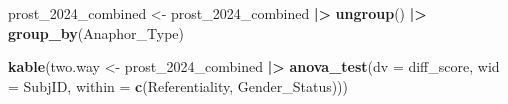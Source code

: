 \documentclass[
  10pt,
]{article}
\newenvironment{Shaded}{\begin{snugshade}}{\end{snugshade}}
\newcommand{\AttributeTok}[1]{\textcolor[rgb]{0.13,0.29,0.53}{#1}}
\newcommand{\FunctionTok}[1]{\textcolor[rgb]{0.13,0.29,0.53}{\textbf{#1}}}
\newcommand{\NormalTok}[1]{#1}
\newcommand{\OtherTok}[1]{\textcolor[rgb]{0.56,0.35,0.01}{#1}}
\newcommand{\SpecialCharTok}[1]{\textcolor[rgb]{0.81,0.36,0.00}{\textbf{#1}}}
\begin{document}
\begin{Shaded}
\begin{Highlighting}[]
\NormalTok{prost\_2024\_combined }\OtherTok{\textless{}{-}}\NormalTok{ prost\_2024\_combined }\SpecialCharTok{|\textgreater{}} \FunctionTok{ungroup}\NormalTok{() }\SpecialCharTok{|\textgreater{}} \FunctionTok{group\_by}\NormalTok{(Anaphor\_Type)}

\FunctionTok{kable}\NormalTok{(two.way }\OtherTok{\textless{}{-}}\NormalTok{ prost\_2024\_combined }\SpecialCharTok{|\textgreater{}}
  \FunctionTok{anova\_test}\NormalTok{(}\AttributeTok{dv =}\NormalTok{ diff\_score, }\AttributeTok{wid =}\NormalTok{ SubjID, }\AttributeTok{within =} \FunctionTok{c}\NormalTok{(Referentiality, Gender\_Status)))}
\end{Highlighting}
\end{Shaded}
\end{document}
